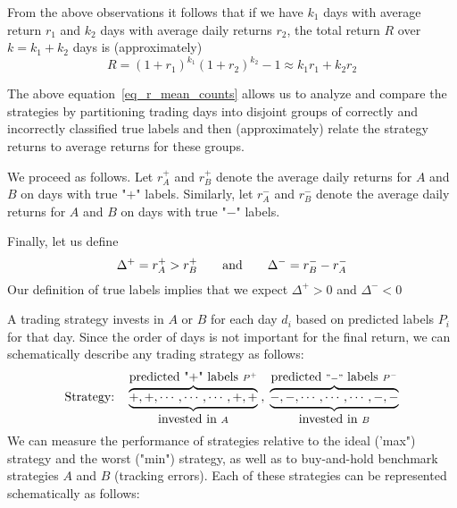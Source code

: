 \documentclass{article}
\begin{document}
From the above observations it follows that if we have $k_{1}$ days with average return $r_{1}$ and
$k_{2}$ days with average daily returns $r_{2}$, the total return $R$ over $k=k_{1}+k_{2}$ days
is (approximately)
\begin{equation}
    R = (1+r_{1})^{k_{1}}(1+r_{2})^{k_{2}}-1     \approx k_{1}r_{1} + k_{2}r_{2}
    \label{eq_r_mean_counts}
\end{equation}

The above equation~\eqref{eq_r_mean_counts}  allows us to analyze and compare the strategies by partitioning trading days into disjoint groups
of correctly and incorrectly
classified true labels and then (approximately) relate the strategy returns to average returns for these groups.

We proceed as follows. Let $r_{A}^{+}$ and $r_{B}^{+}$ denote the average daily returns for $A$ and $B$ on days with true "$+$" labels. Similarly,
let $r_{A}^{-}$ and $r_{B}^{-}$ denote the average daily returns for $A$ and $B$ on days with 
true "$-$" labels. 

Finally, let us define
\begin{equation}
    \Delta^{+} = r_{A}^{+} > r_{B}^{+}\qquad \hbox{and} \qquad \Delta^{-}=r_{B}^{-}-r_{A}^{-}
    \label{define_deltas}
\end{equation}
Our definition of true labels implies that we expect  $\Delta^{+}>0$ and $\Delta^{-}<0$

\medskip
A trading strategy invests in $A$ or $B$ for each day $d_{i}$ based on predicted labels $P_{i}$ for that day.
Since the order of days is not important for the final return, we can schematically describe any trading strategy
as follows:
\begin{equation*}
    \hbox{Strategy:}  \quad \overbrace{\underbrace{ +,+,\cdots, \cdots ,
    \cdots, +,+ }_{\hbox{invested in } A}}^{\hbox{predicted "+" labels }P^{+}}
    \; , \; 
\overbrace{
\underbrace{-,-,\cdots,\cdots,\cdots,-,-}_{\hbox{invested in } B}}^{\hbox{predicted }"-"
\hbox{ labels } P^{-}} 
\end{equation*}
We can measure the performance of strategies relative to the ideal ('max") strategy and the worst ("min") strategy, as well as to buy-and-hold benchmark strategies  $A$ and $B$ (tracking errors).
Each of these strategies can be represented schematically as follows:
\end{document}
